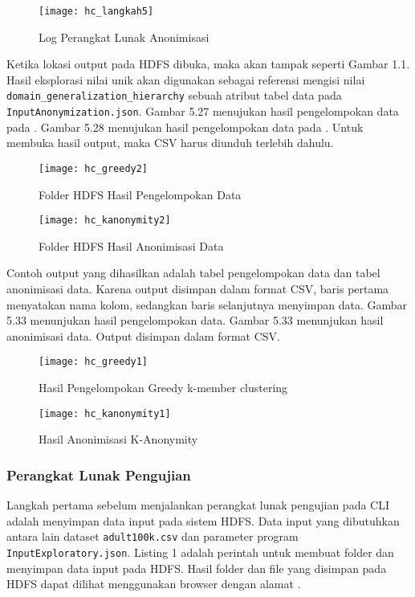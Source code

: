 \begin{figure}[H]
	\centering
	\texttt{[image: hc\_langkah5]}
	\caption{Log Perangkat Lunak Anonimisasi}
	\label{fig:pertama2}
\end{figure}

Ketika lokasi output pada HDFS dibuka, maka akan tampak seperti Gambar 1.1. Hasil eksplorasi nilai unik akan digunakan sebagai referensi mengisi nilai \texttt{domain\_generalization\_hierarchy} sebuah atribut tabel data pada \texttt{InputAnonymization.json}. Gambar 5.27 menujukan hasil pengelompokan data pada . Gambar 5.28 menujukan hasil pengelompokan data pada . Untuk membuka hasil output, maka CSV harus diunduh terlebih dahulu.

\begin{figure}[H]
	\centering
	\texttt{[image: hc\_greedy2]}
	\caption{Folder HDFS Hasil Pengelompokan Data}
	\label{fig:pertama2}
\end{figure}

\begin{figure}[H]
	\centering
	\texttt{[image: hc\_kanonymity2]}
	\caption{Folder HDFS Hasil Anonimisasi Data}
	\label{fig:pertama2}
\end{figure}

Contoh output yang dihasilkan adalah tabel pengelompokan data dan tabel anonimisasi data. Karena output disimpan dalam format CSV, baris pertama menyatakan nama kolom, sedangkan baris selanjutnya menyimpan data. Gambar 5.33 menunjukan hasil pengelompokan data. Gambar 5.33 menunjukan hasil anonimisasi data. Output disimpan dalam format CSV.

\begin{figure}[H]
	\centering
	\texttt{[image: hc\_greedy1]}
	\caption{Hasil Pengelompokan Greedy k-member clustering}
	\label{fig:pertama2}
\end{figure}

\begin{figure}[H]
	\centering
	\texttt{[image: hc\_kanonymity1]}
	\caption{Hasil Anonimisasi K-Anonymity}
	\label{fig:pertama2}
\end{figure}

\newpage
\subsubsection{Perangkat Lunak Pengujian}
Langkah pertama sebelum menjalankan perangkat lunak pengujian pada CLI adalah menyimpan data input pada sistem HDFS. Data input yang dibutuhkan antara lain dataset \texttt{adult100k.csv} dan parameter program \texttt{InputExploratory.json}. Listing 1 adalah perintah untuk membuat folder dan menyimpan data input pada HDFS. Hasil folder dan file yang disimpan pada HDFS dapat dilihat menggunakan browser dengan alamat .

